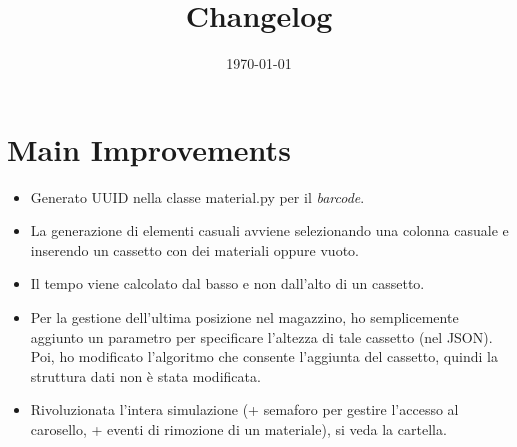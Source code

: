 \documentclass[a4paper]{article}
\begin{document}
	\title{Changelog}
	\date{\today}
	\maketitle
	
	\newpage
	
	\section*{Main Improvements}
	
	\begin{itemize}[label=]
		\item Generato \textsf{UUID} nella classe \textsf{material.py} per il \emph{barcode}.
		
		\item La generazione di elementi casuali avviene selezionando una colonna casuale e inserendo un cassetto con dei materiali oppure vuoto.
		
		\item Il tempo viene calcolato dal basso e non dall'alto di un cassetto.
		
		\item Per la gestione dell'ultima posizione nel magazzino, ho semplicemente aggiunto un parametro per specificare l'altezza di tale cassetto (nel \textsf{JSON}). Poi, ho modificato l'algoritmo che consente l'aggiunta del cassetto, quindi la struttura dati non è stata modificata.
		
		\item Rivoluzionata l'intera simulazione (+ semaforo per gestire l'accesso al carosello, + eventi di rimozione di un materiale), si veda la cartella.
	\end{itemize}
\end{document}
